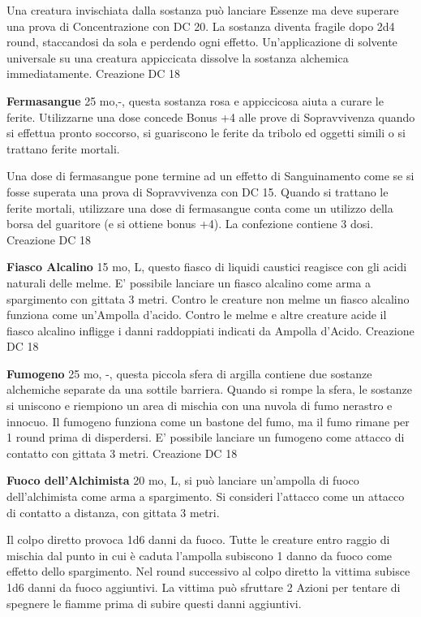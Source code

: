 \documentclass[a4paper,11pt,twoside,openany]{book}
\begin{document}
Una creatura invischiata dalla sostanza può lanciare Essenze ma deve superare una prova di Concentrazione con DC 20. La sostanza diventa fragile dopo 2d4 round, staccandosi da sola e perdendo ogni effetto. Un'applicazione di solvente universale su una creatura appiccicata dissolve la sostanza alchemica immediatamente. Creazione DC 18

\textbf{Fermasangue} 25 mo,-, questa sostanza rosa e appiccicosa aiuta a curare le ferite. Utilizzarne una dose concede Bonus +4 alle prove di Sopravvivenza quando si effettua pronto soccorso, si guariscono le ferite da tribolo ed oggetti simili o si trattano ferite mortali.

Una dose di fermasangue pone termine ad un effetto di Sanguinamento come se si fosse superata una prova di Sopravvivenza con DC 15. Quando si trattano le ferite mortali, utilizzare una dose di fermasangue conta come un utilizzo della borsa del guaritore (e si ottiene bonus +4). La confezione contiene 3 dosi. Creazione DC 18

\textbf{Fiasco Alcalino} 15 mo, L, questo fiasco di liquidi caustici reagisce con gli acidi naturali delle melme. E' possibile lanciare un fiasco alcalino come arma a spargimento con gittata 3 metri. Contro le creature non melme un fiasco alcalino funziona come un'Ampolla d'acido. Contro le melme e altre creature acide il fiasco alcalino infligge i danni raddoppiati indicati da Ampolla d'Acido. Creazione DC 18

\textbf{Fumogeno} 25 mo, -, questa piccola sfera di argilla contiene due sostanze alchemiche separate da una sottile barriera. Quando si rompe la sfera, le sostanze si uniscono e riempiono un area di mischia con una nuvola di fumo nerastro e innocuo. Il fumogeno funziona come un bastone del fumo, ma il fumo rimane per 1 round prima di disperdersi. E' possibile lanciare un fumogeno come attacco di contatto con gittata 3 metri. Creazione DC 18

\textbf{Fuoco dell'Alchimista} 20 mo, L, si può lanciare un'ampolla di fuoco dell'alchimista come arma a spargimento. Si consideri l'attacco come un attacco di contatto a distanza, con gittata 3 metri.

Il colpo diretto provoca 1d6 danni da fuoco. Tutte le creature entro raggio di mischia dal punto in cui è caduta l'ampolla subiscono 1 danno da fuoco come effetto dello spargimento. Nel round successivo al colpo diretto la vittima subisce 1d6 danni da fuoco aggiuntivi. La vittima può sfruttare 2 Azioni per tentare di spegnere le fiamme prima di subire questi danni aggiuntivi.
\end{document}
